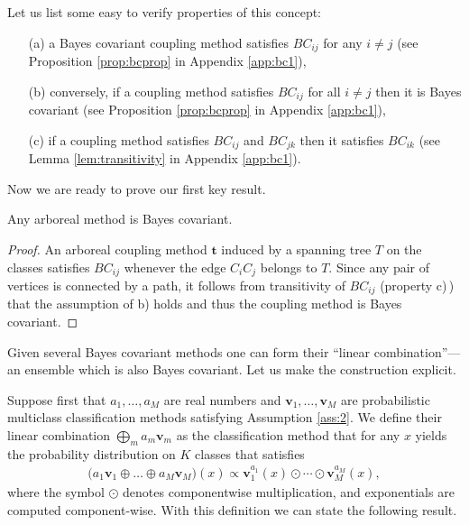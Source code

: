 Let us list some easy to verify properties of this concept:

\begin{itemize}
	\item[(a)] a Bayes covariant coupling method satisfies $BC_{ij}$ for any $i\not= j$ (see Proposition \ref{prop:bcprop} in Appendix \ref{app:bc1}),
	\item[(b)] conversely, if a coupling method satisfies $BC_{ij}$ for all $i\not= j$ then it is Bayes covariant (see Proposition \ref{prop:bcprop} in Appendix \ref{app:bc1}),
	\item[(c)] if a coupling method satisfies $BC_{ij}$ and $BC_{jk}$ then it satisfies $BC_{ik}$ (see Lemma \ref{lem:transitivity} in Appendix \ref{app:bc1}).
\end{itemize}

Now we are ready to prove  our first key result.

\begin{prop}
Any arboreal method is Bayes covariant.
\end{prop}
\begin{proof}

An arboreal coupling method $\boldsymbol{t}$ induced by a spanning tree $T$ on the classes satisfies $BC_{ij}$ whenever the edge $C_iC_j$ belongs to $T$. Since any pair of vertices is connected by a path, it follows from transitivity of $BC_{ij}$ (property c)\,) that the assumption of b) holds and thus the coupling method is Bayes covariant.
	
\end{proof}

Given several Bayes covariant methods one can form  their ``linear combination''---an ensemble which is also Bayes covariant. Let us make the construction explicit.

Suppose first that $a_1, \ldots,a_M$ are real numbers and $\boldsymbol{v}_1, \ldots, \boldsymbol{v}_M$ are probabilistic multiclass classification methods satisfying Assumption \ref{ass:2}. We define their linear combination $\bigoplus_m a_m \boldsymbol{v}_m$ as the classification method that for any $x$ yields the probability distribution on $K$ classes that satisfies
\begin{align*}
 	\bigl(a_1 \boldsymbol{v}_1 \oplus \ldots \oplus a_M \boldsymbol{v}_M\bigr)(x) \propto \boldsymbol{v}_1^{a_1}(x) \odot \cdots \odot \boldsymbol{v}_M^{a_M}(x),
\end{align*}
where the symbol $\odot$ denotes componentwise multiplication, and exponentials are computed component-wise. With this definition we can state the following result.

